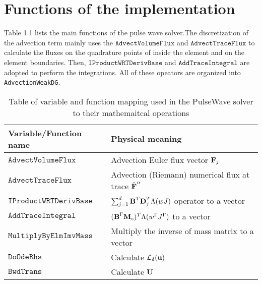 \section{Functions of the implementation}
Table 1.1 lists the main functions of the pulse wave solver.The discretization of the advection term mainly uses the $\texttt{AdvectVolumeFlux}$ and $\texttt{AdvectTraceFlux}$ to calculate the fluxes on the quadrature points of inside the element and on the element boundaries. Then, $\texttt{IProductWRTDerivBase}$ and $\texttt{AddTraceIntegral}$ are adopted to perform the integrations. All of these opeators are organized into \texttt{AdvectionWeakDG}.
\begin{table}[htbp]
\centering
\caption{Table of variable and function mapping used in the PulseWave solver to their mathemaitcal operations}
\begin{tabular}{|l|l|}
\hline
\textbf{Variable/Function name} & \textbf{Physical meaning}\\ \hline

$\texttt{AdvectVolumeFlux}$ & Advection Euler flux vector $\textbf F_j$\\ \hline

$\texttt{AdvectTraceFlux}$ & Advection (Riemann) numerical flux at trace $\hat{\textbf F}^n$\\ \hline

$\texttt{IProductWRTDerivBase}$ & 
{$\sum^{d}_{j=1} \textbf B^T\textbf D^T_j \Lambda(wJ)$ operator to a vector} \\ \hline

$\texttt{AddTraceIntegral}$ & ${(\textbf B^\Gamma\textbf M_c)^T\Lambda(w^\Gamma J^\Gamma)}$ to a vector \\ \hline

$\texttt{MultiplyByElmImvMass}$ & Multiply the inverse of mass matrix to a vector\\ \hline

$\texttt{DoOdeRhs}$ & Calculate $\mathcal{L}_\delta(\textbf u)$\\ \hline

$\texttt{BwdTrans}$ & Calculate $\textbf U$ \\ \hline
\end{tabular}
\end{table}
\clearpage
